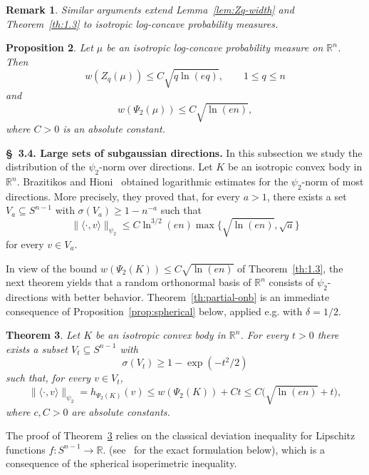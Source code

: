 \documentclass[10pt,a4paper]{amsart}
\newtheorem{theorem}{Theorem}[section]
\newtheorem{proposition}[theorem]{Proposition}
\newtheorem{remark}[theorem]{Remark}
\numberwithin{equation}{section}
\newcommand{\ls}{\leqslant}
\newcommand{\gr}{\geqslant}
\begin{document}
\begin{remark}\rm Similar arguments extend Lemma~\ref{lem:Zq-width} and Theorem~\ref{th:1.3} to isotropic log-concave probability measures.
\end{remark}

\begin{proposition}\label{prop:width-measures}Let $\mu$ be an isotropic log-concave probability measure on $\mathbb{R}^n$. Then
\begin{equation}\label{eq:Zq-width-measure}w(Z_q(\mu))\ls C\sqrt{q\ln(eq)},\qquad 1\ls q\ls n\end{equation}
and 
\[w(\Psi_2(\mu))\ls C\sqrt{\ln(en)},\]
where $C>0$ is an absolute constant.
\end{proposition}



\medskip 

\noindent \textbf{\S~3.4. Large sets of subgaussian directions.}
In this subsection we study the distribution of the $\psi_2$-norm over directions. 
Let $K$ be an isotropic convex body in $\mathbb{R}^n$. Brazitikos and Hioni~\cite{Brazitikos-Hioni-2015} obtained
logarithmic estimates for the $\psi_2$-norm of most directions. More precisely, they proved that, for every $a>1$, there exists a set
$V_a\subseteq S^{n-1}$ with $\sigma(V_a)\gr 1-n^{-a}$ such that
\[\|\langle\cdot,v\rangle\|_{\psi_2}\ls C\ln^{3/2}(en)\max\{\sqrt{\ln(en)},\sqrt a\}\]
for every $v\in V_a$.

In view of the bound $w(\Psi_2(K))\ls C\sqrt{\ln(en)}$ of Theorem~\ref{th:1.3}, the next theorem yields that a random orthonormal basis of $\mathbb{R}^n$ consists of
$\psi_2$-directions with better behavior. Theorem~\ref{th:partial-onb} is an immediate consequence of Proposition~\ref{prop:spherical} below, applied e.g. with $\delta =1/2$.


\begin{theorem}\label{th:spherical}Let $K$ be an isotropic convex body in $\mathbb{R}^n$. For every $t>0$ there exists a
subset $V_t\subseteq S^{n-1}$ with
\[\sigma(V_t)\gr 1-\exp(-t^2/2)\]
such that, for every $v\in V_t$,
\begin{equation}\label{eq:onb-bound}
\|\langle\cdot,v\rangle\|_{\psi_2}=h_{\Psi_2(K)}(v)\ls w(\Psi_2(K))+Ct\ls C\big(\sqrt{\ln(en)}+t\big),
\end{equation}
where $c,C>0$ are absolute constants. 
\end{theorem}


The proof of Theorem~\ref{th:spherical} relies on the classical deviation inequality for Lipschitz functions $f:S^{n-1}\to {\mathbb R}$.
(see~\cite[Proposition~5.20]{Aubrun-Szarek-book} for the exact formulation below), which is a consequence of the spherical isoperimetric inequality.
\end{document}
